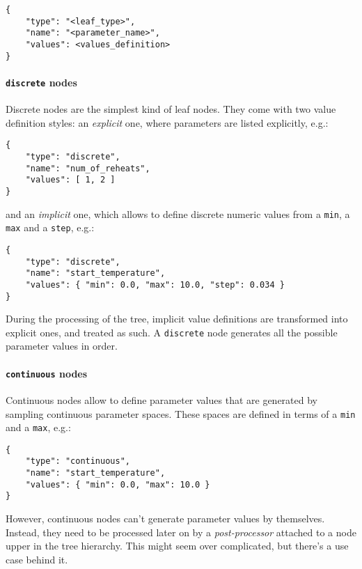 \documentclass[11pt,notitlepage,twoside,a4paper]{article}
\begin{document}
\begin{lstlisting}
{
    "type": "<leaf_type>",
    "name": "<parameter_name>",
    "values": <values_definition>
}
\end{lstlisting}

\paragraph{\texttt{discrete} nodes}

Discrete nodes are the simplest kind of leaf nodes. They come with two
value definition styles: an \emph{explicit} one, where parameters are
listed explicitly, e.g.:

\begin{lstlisting}
{
    "type": "discrete",
    "name": "num_of_reheats",
    "values": [ 1, 2 ]
}
\end{lstlisting}

\noindent
and an \emph{implicit} one, which allows to define discrete numeric
values from a \texttt{min}, a \texttt{max} and a \texttt{step}, e.g.:

\begin{small}
\begin{lstlisting}
{
    "type": "discrete",
    "name": "start_temperature",
    "values": { "min": 0.0, "max": 10.0, "step": 0.034 }
}
\end{lstlisting}
\end{small}

During the processing of the tree, implicit value definitions are
transformed into explicit ones, and treated as such. A \texttt{discrete}
node generates all the possible parameter values in order.

\paragraph{\texttt{continuous} nodes}

Continuous nodes allow to define parameter values that are generated by
sampling continuous parameter spaces. These spaces are defined in terms
of a \texttt{min} and a \texttt{max}, e.g.:

\begin{lstlisting}
{
    "type": "continuous",
    "name": "start_temperature",
    "values": { "min": 0.0, "max": 10.0 }
}
\end{lstlisting}

However, continuous nodes can't generate parameter values by themselves.
Instead, they need to be processed later on by a \emph{post-processor}
attached to a node upper in the tree hierarchy. This might seem over
complicated, but there's a use case behind it.
\end{document}
